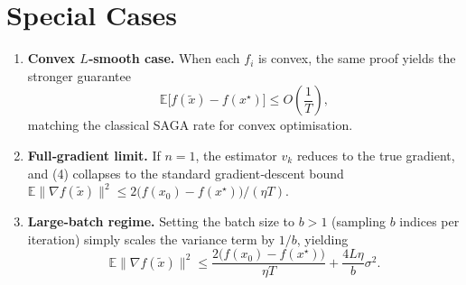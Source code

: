 \documentclass{article}
\newcommand{\E}{\mathbb{E}}
\begin{document}
\section*{Special Cases}
\begin{enumerate}
\item \textbf{Convex $L$‑smooth case.}  When each $f_i$ is convex, the same proof yields the stronger guarantee
\[
\E\bigl[f(\tilde x)-f(x^{\star})\bigr]\le O\!\left(\frac{1}{T}\right),
\]
matching the classical SAGA rate for convex optimisation.
\item \textbf{Full‑gradient limit.}  If $n=1$, the estimator $v_k$ reduces to the true gradient, and (4) collapses to the standard gradient‑descent bound $\E\|\nabla f(\tilde x)\|^{2}\le 2\bigl(f(x_0)-f(x^{\star})\bigr)/(\eta T)$.
\item \textbf{Large‑batch regime.}  Setting the batch size to $b>1$ (sampling $b$ indices per iteration) simply scales the variance term by $1/b$, yielding
\[
\E\|\nabla f(\tilde x)\|^{2}\le\frac{2\bigl(f(x_0)-f(x^{\star})\bigr)}{\eta T}
+\frac{4L\eta}{b}\sigma^{2}.
\]
\end{enumerate}
\end{document}
